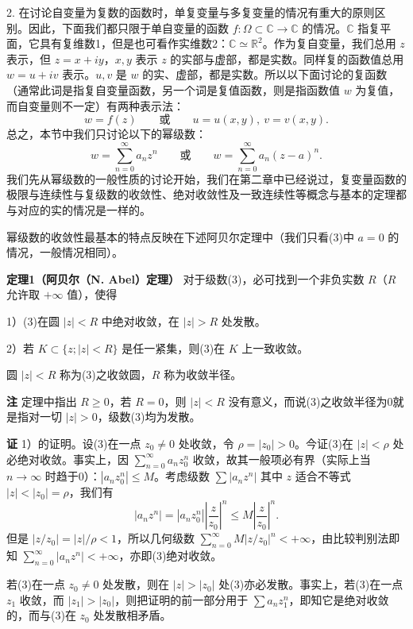 2. 在讨论自变量为复数的函数时，单复变量与多复变量的情况有重大的原则区别。因此，下面我们都只限于单自变量的函数 $f:\Omega\subset\mathbb C\to\mathbb C$ 的情况。$\mathbb C$ 指复平面，它具有复维数1，但是也可看作实维数2：$\mathbb C\simeq\mathbb R^2$。作为复自变量，我们总用 $z$ 表示，但 $z=x+iy$，$x,y$ 表示 $z$ 的实部与虚部，都是实数。同样复的函数值总用 $w=u+iv$ 表示。$u,v$ 是 $w$ 的实、虚部，都是实数。所以以下面讨论的复函数（通常此词是指复自变量函数，另一个词是复值函数，则是指函数值 $w$ 为复值，而自变量则不一定）有两种表示法：
\[
 w=f(z)
 \qquad\text{或}\qquad
 u=u(x,y),\ v=v(x,y).
\]
总之，本节中我们只讨论以下的幂级数：
\begin{equation}
 w=\sum_{n=0}^{\infty}a_nz^n
 \qquad\text{或}\qquad
 w=\sum_{n=0}^{\infty}a_n(z-a)^n.
 \tag{3}
\end{equation}
我们先从幂级数的一般性质的讨论开始，我们在第二章中已经说过，复变量函数的极限与连续性与复级数的收敛性、绝对收敛性及一致连续性等概念与基本的定理都与对应的实的情况是一样的。

幂级数的收敛性最基本的特点反映在下述阿贝尔定理中（我们只看(3)中 $a=0$ 的情况，一般情况相同）。

\noindent\textbf{定理1（阿贝尔（N. Abel）定理）}
对于级数(3)，必可找到一个非负实数 $R$（$R$ 允许取 $+\infty$ 值），使得

1）(3)在圆 $|z|<R$ 中绝对收敛，在 $|z|>R$ 处发散。

2）若 $K\subset\{z;|z|<R\}$ 是任一紧集，则(3)在 $K$ 上一致收敛。

圆 $|z|<R$ 称为(3)之收敛圆，$R$ 称为收敛半径。

\noindent\textbf{注}
定理中指出 $R\ge0$，若 $R=0$，则 $|z|<R$ 没有意义，而说(3)之收敛半径为0就是指对一切 $|z|>0$，级数(3)均为发散。

\noindent\textbf{证}
1）的证明。设(3)在一点 $z_0\ne0$ 处收敛，令 $\rho=|z_0|>0$。今证(3)在 $|z|<\rho$ 处必绝对收敛。事实上，因 $\sum_{n=0}^{\infty}a_nz_0^n$ 收敛，故其一般项必有界（实际上当 $n\to\infty$ 时趋于0）：$|a_nz_0^n|\le M$。考虑级数 $\sum|a_nz^n|$ 其中 $z$ 适合不等式 $|z|<|z_0|=\rho$，我们有
\[
 |a_nz^n|=|a_nz_0^n|\left|\frac z{z_0}\right|^n\le M\left|\frac z{z_0}\right|^n.
\]
但是 $|z/z_0|=|z|/\rho<1$，所以几何级数 $\sum_{n=0}^{\infty}M|z/z_0|^n<+\infty$，由比较判别法即知 $\sum_{n=0}^{\infty}|a_nz^n|<+\infty$，亦即(3)绝对收敛。

若(3)在一点 $z_0\ne0$ 处发散，则在 $|z|>|z_0|$ 处(3)亦必发散。事实上，若(3)在一点 $z_1$ 收敛，而 $|z_1|>|z_0|$，则把证明的前一部分用于 $\sum a_nz_1^n$，即知它是绝对收敛的，而与(3)在 $z_0$ 处发散相矛盾。


